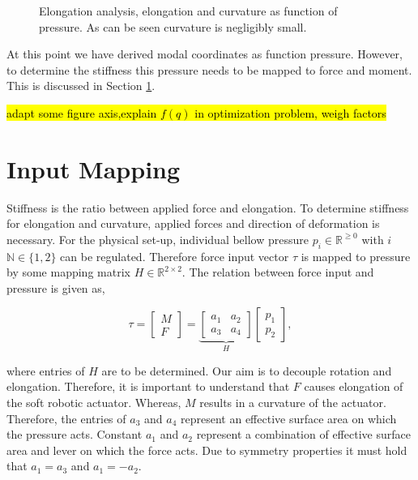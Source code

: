 \begin{figure}[H]
\begin{minipage}{0.5\textwidth}
        \caption{Elongation analysis, elongation and curvature as function of pressure. As can be seen curvature is negligibly small.}
        \label{fig3:elongationvspressure}
    \end{minipage}
\end{figure}

\newpage


At this point we have derived modal coordinates as function pressure. However, to determine the stiffness this pressure needs to be mapped to force and moment. This is discussed in Section \ref{sec3:InputMapping}.


\hl{adapt some figure axis,explain $f(q)$ in optimization problem, weigh factors}




\section{Input Mapping}
\label{sec3:InputMapping}

Stiffness is the ratio between applied force and elongation. To determine stiffness for elongation and curvature, applied forces and direction of deformation is necessary. For the physical set-up, individual bellow pressure $p_i \in \mathbb{R}^{\geq 0}$ with $i$ $\mathbb{N} \in \{1,2\}$ can be regulated. Therefore force input vector $\tau$ is mapped to pressure by some mapping matrix $H \in \mathbb{R}^{2 \times 2}$. The relation between force input and pressure is given as, 

\begin{equation}
   \tau =   \begin{bmatrix} M \\ F \end{bmatrix}     = \underbrace{\begin{bmatrix}  a_1 & a_2 \\ a_3 & a_4 \end{bmatrix}}_{H}         \begin{bmatrix}  p_1 \\ p_2 \end{bmatrix}, \label{eq3:H}
\end{equation}

where entries of $H$ are to be determined. Our aim is to decouple rotation and elongation. Therefore, it is important to understand that $F$ causes elongation of the soft robotic actuator. Whereas, $M$ results in a curvature of the actuator. Therefore, the entries of $a_3$ and $a_4$ represent an effective surface area on which the pressure acts. Constant $a_1$ and $a_2$ represent a combination of effective surface area and lever on which the force acts. Due to symmetry properties it must hold that $a_1 = a_3$ and $a_1 = -a_2$.

